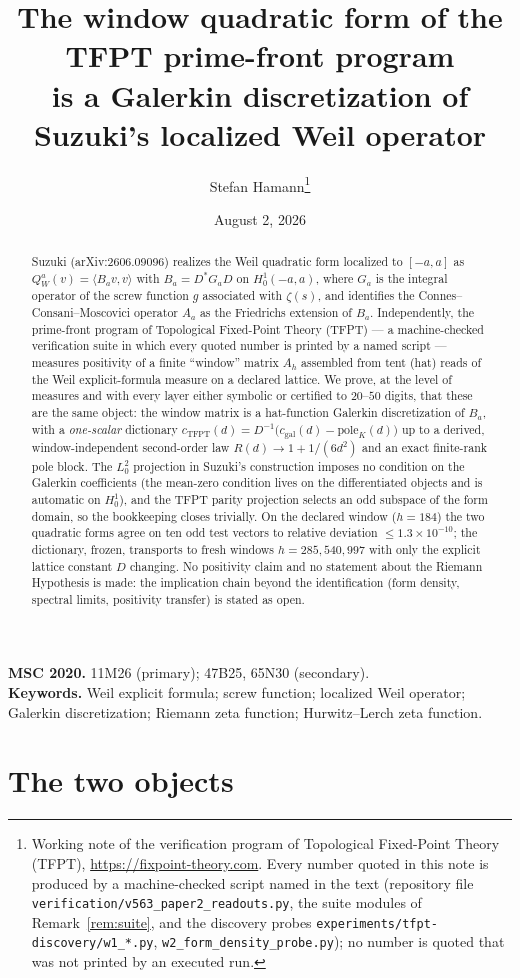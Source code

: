 \documentclass[11pt,a4paper]{article}
\title{The window quadratic form of the TFPT prime-front program\\
is a Galerkin discretization of Suzuki's localized Weil operator}
\author{Stefan Hamann\thanks{Working note of the verification program
of Topological Fixed-Point Theory (TFPT),
\url{https://fixpoint-theory.com}.  Every number quoted in this note is
produced by a machine-checked script named in the text (repository
file \texttt{verification/v563\_paper2\_readouts.py}, the suite modules
of Remark~\ref{rem:suite}, and the discovery probes
\texttt{experiments/tfpt-discovery/w1\_*.py},
\texttt{w2\_form\_density\_probe.py}); no number is quoted that was not
printed by an executed run.}}
\date{August 2, 2026}
\theoremstyle{remark}
\begin{document}
\maketitle

\begin{abstract}
Suzuki (arXiv:2606.09096) realizes the Weil quadratic form localized to
$[-a,a]$ as $Q_W^a(v)=\langle B_a v,v\rangle$ with
$B_a=D^*G_aD$ on $H^1_0(-a,a)$, where $G_a$ is the integral operator of
the screw function $g$ associated with $\zeta(s)$, and identifies the
Connes--Consani--Moscovici operator $A_a$ as the Friedrichs extension of
$B_a$.  Independently, the prime-front program of Topological
Fixed-Point Theory (TFPT) --- a machine-checked verification suite in
which every quoted number is printed by a named script --- measures
positivity of a finite ``window'' matrix $A_h$ assembled from tent
(hat) reads of the Weil explicit-formula measure on a declared
lattice.  We prove, at the
level of measures and with every layer either symbolic or certified to
$20$--$50$ digits, that these are the same object: the window matrix is
a hat-function Galerkin discretization of $B_a$, with a
\emph{one-scalar} dictionary $c_{\mathrm{TFPT}}(d)=D^{-1}
\bigl(c_{\mathrm{gal}}(d)-\mathrm{pole}_K(d)\bigr)$ up to a derived,
window-independent second-order law $R(d)\to 1+1/(6d^2)$ and an exact
finite-rank pole block.  The $L^2_0$ projection in Suzuki's construction
imposes no condition on the Galerkin coefficients (the mean-zero
condition lives on the differentiated objects and is automatic on
$H^1_0$), and the TFPT parity projection selects an odd subspace of the
form domain, so the bookkeeping closes trivially.  On the declared
window ($h=184$) the two quadratic forms agree on ten odd test vectors
to relative deviation $\le 1.3\times10^{-10}$; the dictionary,
frozen, transports to fresh windows $h=285,540,997$ with only the
explicit lattice constant $D$ changing.  No positivity claim and no
statement about the Riemann Hypothesis is made: the implication chain
beyond the identification (form density, spectral limits, positivity
transfer) is stated as open.
\end{abstract}

\medskip
\noindent\textbf{MSC 2020.} 11M26 (primary); 47B25, 65N30 (secondary).\\
\textbf{Keywords.} Weil explicit formula; screw function; localized
Weil operator; Galerkin discretization; Riemann zeta function;
Hurwitz--Lerch zeta function.

\section{The two objects}
\end{document}

